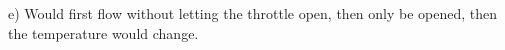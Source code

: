 e) Would first flow without letting the throttle open, then only be opened, then the temperature would change.